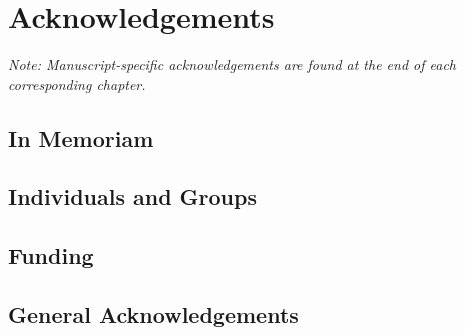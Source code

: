 \chapter*{Acknowledgements}
{}

\textit{Note: Manuscript-specific acknowledgements are found at the end of each corresponding chapter.}

\section*{In Memoriam}


\section*{Individuals and Groups}


\section*{Funding}


\section*{General Acknowledgements}
